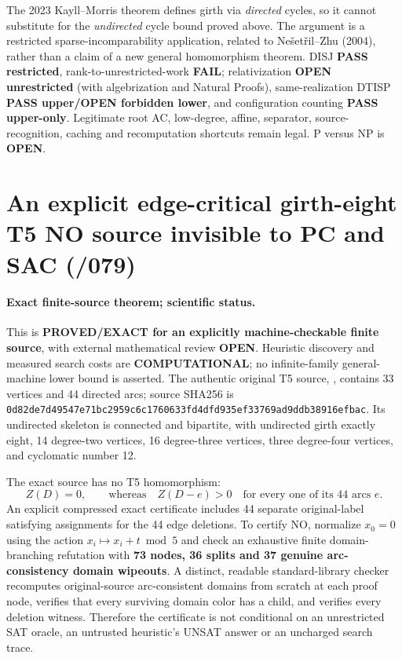 \documentclass[11pt]{article}
\begin{document}
The 2023 Kayll--Morris theorem defines girth via
\emph{directed} cycles, so it cannot substitute
for the \emph{undirected} cycle bound proved above.
The argument is a restricted sparse-incomparability
application, related to Ne\v{s}et\v{r}il--Zhu (2004),
rather than a claim of a new general homomorphism theorem.
DISJ \textbf{PASS restricted}, rank-to-unrestricted-work
\textbf{FAIL}; relativization \textbf{OPEN unrestricted}
(with algebrization and Natural Proofs), same-realization
DTISP \textbf{PASS upper/OPEN forbidden lower}, and
configuration counting \textbf{PASS upper-only}.
Legitimate root AC, low-degree, affine, separator,
source-recognition, caching and recomputation shortcuts
remain legal. P versus NP is \textbf{OPEN}.

\section{An explicit edge-critical girth-eight T5 NO source invisible to PC and SAC (/079)}
\paragraph{Exact finite-source theorem; scientific status.}
This is \textbf{PROVED/EXACT for an explicitly machine-checkable
finite source}, with external mathematical review \textbf{OPEN}.
Heuristic discovery and measured search costs are
\textbf{COMPUTATIONAL}; no infinite-family general-machine
lower bound is asserted. The authentic original T5 source,
,
contains 33 vertices and 44 directed arcs; source SHA256 is
\texttt{0d82de7d49547e71bc2959c6c1760633fd4dfd935ef33769ad9ddb38916efbac}.
Its undirected skeleton is connected and bipartite, with
undirected girth exactly eight, 14 degree-two vertices,
16 degree-three vertices, three degree-four vertices, and
cyclomatic number 12.

The exact source has no T5 homomorphism:
\[
  Z(D)=0,\qquad
  \text{whereas}\quad Z(D-e)>0\quad
  \text{for every one of its 44 arcs } e.
\]
An explicit compressed exact certificate includes 44 separate
original-label satisfying assignments for the 44 edge deletions.
To certify NO, normalize $x_0=0$ using the action
$x_i\mapsto x_i+t\bmod5$ and check an exhaustive finite
domain-branching refutation with \textbf{73 nodes, 36 splits
and 37 genuine arc-consistency domain wipeouts}. A distinct,
readable standard-library checker recomputes original-source
arc-consistent domains from scratch at each proof node, verifies
that every surviving domain color has a child, and verifies
every deletion witness. Therefore the certificate is not
conditional on an unrestricted SAT oracle, an untrusted
heuristic's UNSAT answer or an uncharged search trace.
\end{document}
